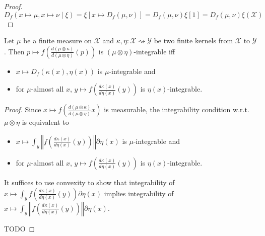 \begin{proof}\leanok
\uses{}
$$D_f(x \mapsto \mu, x \mapsto \nu \mid \xi) 
= \xi\left[x \mapsto D_f(\mu, \nu)\right] 
= D_f(\mu, \nu) \xi\left[1\right] 
= D_f(\mu, \nu) \xi (\mathcal X)$$
\end{proof}


\begin{lemma}
  \label{lem:integrable_fDiv_compProd_iff}
  \leanok
  Let $\mu$ be a finite measure on $\mathcal X$ and $\kappa, \eta : \mathcal X \rightsquigarrow \mathcal Y$ be two finite kernels from $\mathcal X$ to $\mathcal Y$.
  Then $p \mapsto f \left(\frac{d(\mu \otimes \kappa)}{d(\mu \otimes \eta)}(p)\right)$ is $(\mu \otimes \eta)$-integrable iff
  \begin{itemize}
    \item $x \mapsto D_f(\kappa(x), \eta(x))$ is $\mu$-integrable and
    \item for $\mu$-almost all $x$, $y \mapsto f \left( \frac{d\kappa(x)}{d\eta(x)}(y) \right)$ is $\eta(x)$-integrable. 
  \end{itemize}
\end{lemma}

\begin{proof}
Since $x \mapsto f \left(\frac{d(\mu \otimes \kappa)}{d(\mu \otimes \eta)} x \right)$ is measurable, the integrability condition w.r.t. $\mu \otimes \eta$ is equivalent to
\begin{itemize}
    \item $x \mapsto \int_y \left\Vert f \left( \frac{d\kappa(x)}{d\eta(x)}(y) \right) \right\Vert \partial \eta(x)$ is $\mu$-integrable and
    \item for $\mu$-almost all $x$, $y \mapsto f \left( \frac{d\kappa(x)}{d\eta(x)}(y) \right)$ is $\eta(x)$-integrable. 
  \end{itemize}
It suffices to use convexity to show that integrability of $x \mapsto \int_y f \left( \frac{d\kappa(x)}{d\eta(x)}(y) \right) \partial \eta(x)$ implies integrability of $x \mapsto \int_y \left\Vert f \left( \frac{d\kappa(x)}{d\eta(x)}(y) \right) \right\Vert \partial \eta(x)$.

TODO
\end{proof}


